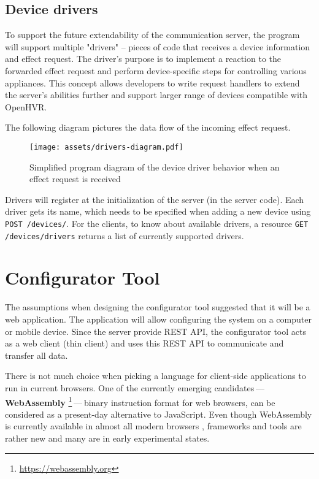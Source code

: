 \subsection{Device drivers}
To support the future extendability of the communication server, the program
will support multiple "drivers" -- pieces of code that receives a device information 
and effect request. The driver's purpose is to implement a reaction to the 
forwarded effect request and perform device-specific steps for controlling
various appliances.
This concept allows developers to write request handlers to extend the server’s 
abilities further and support larger range of devices compatible with OpenHVR.

The following diagram pictures the data flow of the incoming effect request.

\begin{figure}[h]{}
\centering\texttt{[image: assets/drivers-diagram.pdf]}
\caption{Simplified program diagram of the device driver behavior when an effect request is received}
\end{figure}

Drivers will register at the initialization of the server (in the server code).
Each driver gets its name, which needs to be specified when adding a new
device using \texttt{POST /devices/}. For the clients, to know about available
drivers, a resource \texttt{GET /devices/drivers} returns a list
of currently supported drivers.


\hypertarget{x-configurator-tool}{\section{Configurator Tool}}
The assumptions when designing the configurator tool suggested that it will
be a web application. The application will allow configuring the system
on a computer or mobile device. Since the server provide REST API,
the configurator tool acts as a
web client (thin client) and uses this REST API to communicate and transfer
all data.


There is not much choice when picking a language for client-side applications
to run in current browsers. One of the currently
emerging candidates — \textbf{WebAssembly} \footnote{\href{https://webassembly.org}{https://webassembly.org}} — binary instruction format for web browsers, can be considered as
a present-day alternative to JavaScript. Even though WebAssembly is
currently available in almost all modern browsers \cite{wasmroadmap}, frameworks
and tools are rather new and many are in early experimental states.


